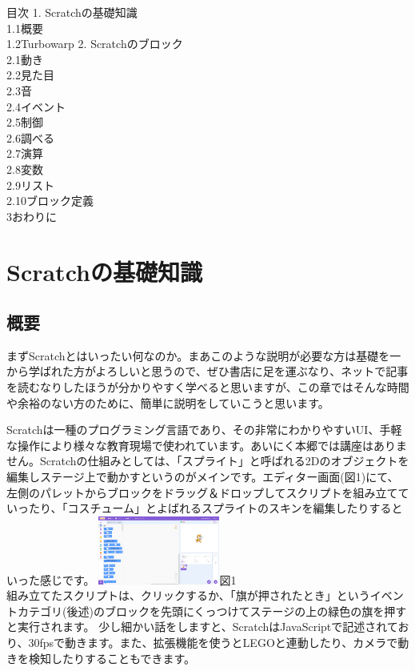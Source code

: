 \documentclass[b5paper,10pt]{jsarticle}
\begin{document}
\begin{multicols*}{3}
\begin{itembox}{目次}
{1. }Scratchの基礎知識\\
{ 1.1}概要\\
{ 1.2}Turbowarp
{2. }Scratchのブロック\\
{ 2.1}動き\\
{ 2.2}見た目\\
{ 2.3}音\\
{ 2.4}イベント\\
{ 2.5}制御\\
{ 2.6}調べる\\
{ 2.7}演算\\
{ 2.8}変数\\
{ 2.9}リスト\\
{ 2.10}ブロック定義\\
{3}おわりに
\end{itembox}

\section{Scratchの基礎知識}
\subsection{概要}
まずScratchとはいったい何なのか。まあこのような説明が必要な方は基礎を一から学ばれた方がよろしいと思うので、ぜひ書店に足を運ぶなり、ネットで記事を読むなりしたほうが分かりやすく学べると思いますが、この章ではそんな時間や余裕のない方のために、簡単に説明をしていこうと思います。

Scratchは一種のプログラミング言語であり、その非常にわかりやすいUI、手軽な操作により様々な教育現場で使われています。あいにく本郷では講座はありません。Scratchの仕組みとしては、「スプライト」と呼ばれる2Dのオブジェクトを編集しステージ上で動かすというのがメインです。エディター画面(図1)にて、左側のパレットからブロックをドラッグ＆ドロップしてスクリプトを組み立てていったり、「コスチューム」とよばれるスプライトのスキンを編集したりするといった感じです。
\includegraphics[width=4cm]{editor.png}図1\\
組み立てたスクリプトは、クリックするか、「旗が押されたとき」というイベントカテゴリ(後述)のブロックを先頭にくっつけてステージの上の緑色の旗を押すと実行されます。
少し細かい話をしますと、ScratchはJavaScriptで記述されており、30fpsで動きます。また、拡張機能を使うとLEGOと連動したり、カメラで動きを検知したりすることもできます。


\end{multicols*}
\end{document}
